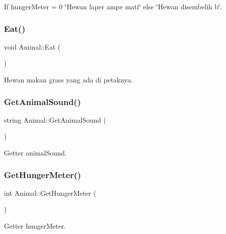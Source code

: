 If hunger\+Meter = 0 \char`\"{}\+Hewan laper ampe mati\char`\"{} else \char`\"{}\+Hewan disembelih b\char`\"{}. 

\mbox{\label{classAnimal_acdae3d782b7451096932296179860a12}} 
\subsubsection{\texorpdfstring{Eat()}{Eat()}}
{\footnotesize\ttfamily void Animal\+::\+Eat (\begin{DoxyParamCaption}{ }\end{DoxyParamCaption})}



Hewan makan grass yang ada di petaknya. 

\mbox{\label{classAnimal_a3656294d99761e2e7786eb592cecfd15}} 
\subsubsection{\texorpdfstring{GetAnimalSound()}{GetAnimalSound()}}
{\footnotesize\ttfamily string Animal\+::\+Get\+Animal\+Sound (\begin{DoxyParamCaption}{ }\end{DoxyParamCaption})}



Getter animal\+Sound. 

\mbox{\label{classAnimal_af615c696ba45912dffeb7a149f531238}} 
\subsubsection{\texorpdfstring{GetHungerMeter()}{GetHungerMeter()}}
{\footnotesize\ttfamily int Animal\+::\+Get\+Hunger\+Meter (\begin{DoxyParamCaption}{ }\end{DoxyParamCaption})}



Getter hunger\+Meter. 

\mbox{\label{classAnimal_a24334feff002c33f5513902546daba9b}} 

